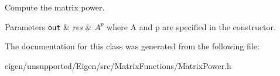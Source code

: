 Compute the matrix power. 


\begin{DoxyParams}[1]{Parameters}
\mbox{\tt out}  & {\em res} & $ A^p $ where A and p are specified in the constructor. \\
\hline
\end{DoxyParams}


The documentation for this class was generated from the following file\+:\begin{DoxyCompactItemize}
\item 
eigen/unsupported/\+Eigen/src/\+Matrix\+Functions/\+Matrix\+Power.\+h\end{DoxyCompactItemize}
